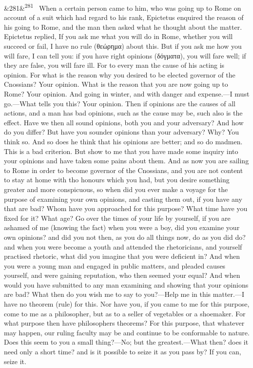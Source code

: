 \documentclass[12pt]{article}
\newcommand{\para}[1][]{\par\noindent\ifx&#1&\else\textsuperscript{\footnotesize #1}~\fi}
\begin{document}
\para[281] When a certain person came to him, who was going up to Rome on account of a suit which had regard to his rank, Epictetus enquired the reason of his going to Rome, and the man then asked what he thought about the matter. Epictetus replied, If you ask me what you will do in Rome, whether you will succeed or fail, I have no rule (θεώρημα) about this. But if you ask me how you will fare, I can tell you: if you have right opinions (δόγματα), you will fare well; if they are false, you will fare ill. For to every man the cause of his acting is opinion. For what is the reason why you desired to be elected governor of the Cnossians? Your opinion. What is the reason that you are now going up to Rome? Your opinion. And going in winter, and with danger and expense.—I must go.—What tells you this? Your opinion. Then if opinions are the causes of all actions, and a man has bad opinions, such as the cause may be, such also is the effect. Have we then all sound opinions, both you and your adversary? And how do you differ? But have you sounder opinions than your adversary? Why? You think so. And so does he think that his opinions are better; and so do madmen. This is a bad criterion. But show to me that you have made some inquiry into your opinions and have taken some pains about them. And as now you are sailing to Rome in order to become governor of the Cnossians, and you are not content to stay at home with tho honours which you had, but you desire something greater and more conspicuous, so when did you ever make a voyage for the purpose of examining your own opinions, and casting them out, if you have any that are bad? Whom have you approached for this purpose? What time have you fixed for it? What age? Go over the times of your life by yourself, if you are ashamed of me (knowing the fact) when you were a boy, did you examine your own opinions? and did you not then, as you do all things now, do as you did do? and when you were become a youth and attended the rhetoricians, and yourself practised rhetoric, what did you imagine that you were deficient in? And when you were a young man and engaged in public matters, and pleaded causes yourself, and were gaining reputation, who then seemed your equal? And when would you have submitted to any man examining and showing that your opinions are bad? What then do you wish me to say to you?—Help me in this matter.—I have no theorem (rule) for this. Nor have you, if you came to me for this purpose, come to me as a philosopher, but as to a seller of vegetables or a shoemaker. For what purpose then have philosophers theorems? For this purpose, that whatever may happen, our ruling faculty may be and continue to be conformable to nature. Does this seem to you a small thing?—No; but the greatest.—What then? does it need only a short time? and is it possible to seize it as you pass by? If you can, seize it.
\end{document}
